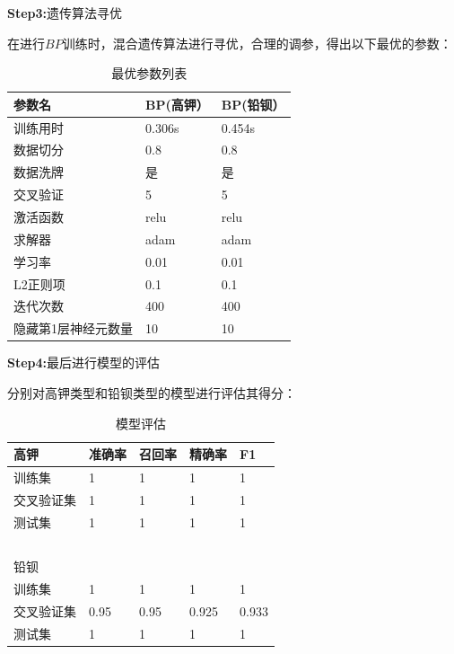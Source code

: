 \documentclass[UTF8]{ctexart}
\begin{document}
\textbf{Step3:}遗传算法寻优

在进行$BP$训练时，混合遗传算法进行寻优，合理的调参，得出以下最优的参数：

\begin{table}[H]                                                                                                     
    \centering
    \caption{最优参数列表}
    \begin{tabular}{|l|l|l|}
    \hline
        参数名 & BP(高钾） & BP(铅钡） \\ \hline
        训练用时 & 0.306s & 0.454s \\ \hline
        数据切分 & 0.8 & 0.8 \\ \hline
        数据洗牌 & 是 & 是 \\ \hline
        交叉验证 & 5 & 5 \\ \hline
        激活函数 & relu & relu \\ \hline
        求解器 & adam & adam \\ \hline                                       
        学习率 & 0.01 & 0.01 \\ \hline
        L2正则项 & 0.1 & 0.1 \\ \hline
        迭代次数 & 400 & 400 \\ \hline
        隐藏第1层神经元数量 & 10 & 10 \\ \hline
    \end{tabular}
\end{table}

\textbf{Step4:}最后进行模型的评估



分别对高钾类型和铅钡类型的模型进行评估其得分：

\begin{table}[H]
    \centering
    \caption{模型评估}
    \begin{tabular}{|l|l|l|l|l|}
    \hline
        高钾 & 准确率 & 召回率 & 精确率 & F1 \\ \hline
        训练集 & 1 & 1 & 1 & 1 \\ \hline
        交叉验证集 & 1 & 1 & 1 & 1 \\ \hline
        测试集 & 1 & 1 & 1 & 1 \\ \hline
        ~ & ~ & ~ & ~ & ~ \\ \hline
        铅钡 & ~ & ~ & ~ & ~ \\ \hline
        训练集 & 1 & 1 & 1 & 1 \\ \hline
        交叉验证集 & 0.95 & 0.95 & 0.925 & 0.933 \\ \hline
        测试集 & 1 & 1 & 1 & 1 \\ \hline
    \end{tabular}
\end{table}
\end{document}

